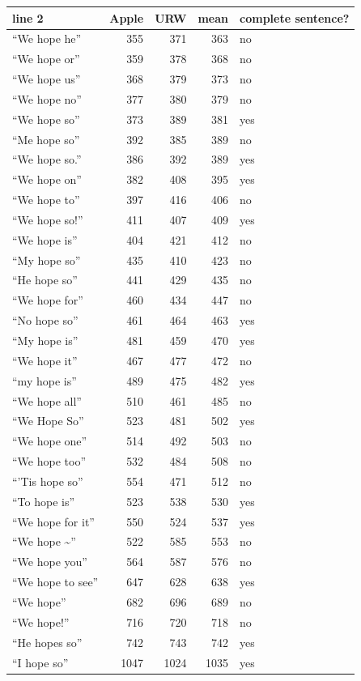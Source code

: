 \begin{tabular}{lrrrl}\toprule
 line 2 & Apple & URW & mean & complete sentence? \\ \midrule
``We hope he'' & 355 & 371 & 363 & no \\
``We hope or'' & 359 & 378 & 368 & no \\
``We hope us'' & 368 & 379 & 373 & no \\
``We hope no'' & 377 & 380 & 379 & no \\
``We hope so'' & 373 & 389 & 381 & yes \\
``Me hope so'' & 392 & 385 & 389 & no \\
``We hope so.'' & 386 & 392 & 389 & yes \\
``We hope on'' & 382 & 408 & 395 & yes \\
``We hope to'' & 397 & 416 & 406 & no \\
``We hope so!'' & 411 & 407 & 409 & yes \\
``We hope is'' & 404 & 421 & 412 & no \\
``My hope so'' & 435 & 410 & 423 & no \\
``He hope so'' & 441 & 429 & 435 & no \\
``We hope for'' & 460 & 434 & 447 & no \\
``No hope so'' & 461 & 464 & 463 & yes \\
``My hope is'' & 481 & 459 & 470 & yes \\
``We hope it'' & 467 & 477 & 472 & no \\
``my hope is'' & 489 & 475 & 482 & yes \\
``We hope all'' & 510 & 461 & 485 & no \\
``We Hope So'' & 523 & 481 & 502 & yes \\
``We hope one'' & 514 & 492 & 503 & no \\
``We hope too'' & 532 & 484 & 508 & no \\
``'Tis hope so'' & 554 & 471 & 512 & no \\
``To hope is'' & 523 & 538 & 530 & yes \\
``We hope for it'' & 550 & 524 & 537 & yes \\
``We hope \textasciitilde{}'' & 522 & 585 & 553 & no \\
``We hope you'' & 564 & 587 & 576 & no \\
``We hope to see'' & 647 & 628 & 638 & yes \\
``We hope'' & 682 & 696 & 689 & no \\
``We hope!'' & 716 & 720 & 718 & no \\
``He hopes so'' & 742 & 743 & 742 & yes \\
``I hope so'' & 1047 & 1024 & 1035 & yes \\
\bottomrule\end{tabular}
